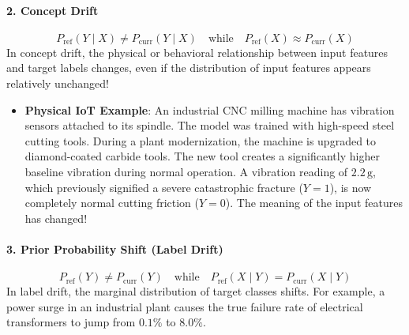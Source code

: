 \paragraph{2. Concept Drift}
\begin{equation}
P_{\text{ref}}(Y \mid X) \neq P_{\text{curr}}(Y \mid X) \quad \text{while} \quad P_{\text{ref}}(X) \approx P_{\text{curr}}(X)
\end{equation}
In concept drift, the physical or behavioral relationship between input features and target labels changes, even if the distribution of input features appears relatively unchanged!
\begin{itemize}
    \item \textbf{Physical IoT Example}: An industrial CNC milling machine has vibration sensors attached to its spindle. The model was trained with high-speed steel cutting tools. During a plant modernization, the machine is upgraded to diamond-coated carbide tools. The new tool creates a significantly higher baseline vibration during normal operation. A vibration reading of $2.2\,\text{g}$, which previously signified a severe catastrophic fracture ($Y = 1$), is now completely normal cutting friction ($Y = 0$). The meaning of the input features has changed!
\end{itemize}

\paragraph{3. Prior Probability Shift (Label Drift)}
\begin{equation}
P_{\text{ref}}(Y) \neq P_{\text{curr}}(Y) \quad \text{while} \quad P_{\text{ref}}(X \mid Y) = P_{\text{curr}}(X \mid Y)
\end{equation}
In label drift, the marginal distribution of target classes shifts. For example, a power surge in an industrial plant causes the true failure rate of electrical transformers to jump from $0.1\%$ to $8.0\%$.

